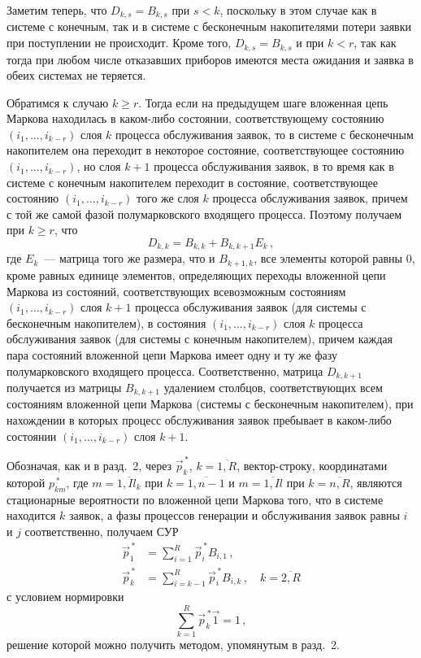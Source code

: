 \smallskip
\begin{multicols}{2}

Заметим теперь, что $D_{k,s}=B_{k,s}$ при $s<k$, поскольку в этом случае как
в системе с конечным, так и в системе с бесконечным накопителями
потери заявки при поступлении не происходит.
Кроме того, $D_{k,s}=B_{k,s}$ и при $k<r$, так как тогда при любом
числе отказавших приборов имеются места ожидания и заявка в обеих
системах не теряется.

Обратимся к случаю $k\geq r$.
Тогда если на предыду\-щем шаге вложенная цепь Маркова находилась в
каком-либо состоянии, соответствующему состоянию
$(i_1,\ldots,i_{k-r})$ слоя $k$ процесса обслуживания заявок,
то в системе с бесконечным накопителем она переходит в
некоторое состояние, соответствующее состоянию
$(i_1,\ldots,i_{k-r})$, но слоя $k+1$ процесса обслуживания заявок,
в то время как в сис\-те\-ме с конечным накопителем переходит в
состояние, соответствующее состоянию
$(i_1,\ldots,i_{k-r})$ того же слоя $k$ процесса обслуживания заявок,
причем с той же самой фазой полумарковского входящего процесса.
Поэтому получаем при $k\geq r$, что
$$
D_{k,k}=B_{k,k}+B_{k,k+1} E_k\,,
$$
где $E_k$~--- матрица того же размера,
что и $B_{k+1,k}$, все элементы которой равны 0, кроме равных единице
элементов,
опре\-де\-ля\-ющих переходы вложенной цепи Маркова из состояний, соответствующих
всевозможным состояниям
$(i_1,\ldots,i_{k-r})$ слоя $k+1$
процесса обслуживания заявок (для системы с бесконечным накопителем),
в состояния
$(i_1,\ldots,i_{k-r})$ слоя $k$
процесса обслуживания заявок (для системы с конечным накопителем),
причем каждая пара состояний вложенной цепи  Маркова имеет одну
и ту же фазу полумарковского входящего процесса.
Соответственно, матрица $D_{k,k+1}$ получается из матрицы $B_{k,k+1}$
удалением столбцов, соответствующих всем состояниям вложенной цепи
Маркова (системы с бесконечным накопителем), при нахождении в которых
процесс обслуживания заявок пребывает в каком-либо состоянии
$(i_1,\ldots,i_{k-r})$ слоя $k+1$.

Обозначая, как и в разд.~2, через $\vec p_k^{\,*}$, $k=\overline{1,R}$,
вектор-строку, координатами которой $p_{km}^{\,*}$, где
$m=\overline{1,I l_k}$ при
$k=\overline{1,n-1}$ и $m=\overline{1,Il}$ при $k=\overline{n,R}$,
являются стационарные вероятности по вложенной цепи Маркова того, что
в системе находится $k$ заявок, а фазы процессов
генерации и обслуживания заявок равны $i$ и $j$ соответственно,
получаем СУР
\begin{align*}
\vec p_1^{\,*} &=
\sum\limits_{i=1}^{R}
\vec p_i^{\,*} B_{i,1}\,,\\
\vec p_k^{\,*} &=
\sum\limits_{i=k-1}^{R}
\vec p_i^{\,*} B_{i,k}\,,
\quad k=\overline{2,R}
\end{align*}
с условием нормировки
\begin{equation*}
\sum\limits_{k=1}^{R} \vec p^{\,*}_k \vec1 = 1\,,
\end{equation*}
решение которой можно получить методом, упомянутым в разд.~2.


\end{multicols}

